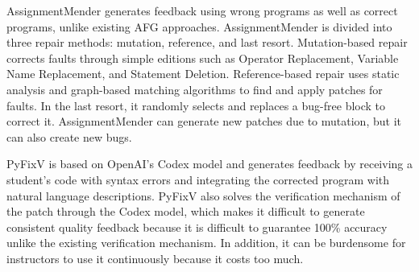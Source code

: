 \documentclass[10pt,conference]{IEEEtran}
\begin{document}
        AssignmentMender\cite{li2022generating} generates feedback using wrong programs as well as correct programs, unlike existing AFG approaches. AssignmentMender is divided into three repair methods: mutation, reference, and last resort. Mutation-based repair corrects faults through simple editions such as Operator Replacement, Variable Name Replacement, and Statement Deletion. Reference-based repair uses static analysis and graph-based matching algorithms to find and apply patches for faults. In the last resort, it randomly selects and replaces a bug-free block to correct it. AssignmentMender can generate new patches due to mutation, but it can also create new bugs.
        
        
        PyFixV\cite{phung2023generating} is based on OpenAI's Codex model and generates feedback by receiving a student's code with syntax errors and integrating the corrected program with natural language descriptions. PyFixV also solves the verification mechanism of the patch through the Codex model, which makes it difficult to generate consistent quality feedback because it is difficult to guarantee 100\% accuracy unlike the existing verification mechanism. In addition, it can be burdensome for instructors to use it continuously because it costs too much\cite{joshi2023repair}.
        
\end{document}
